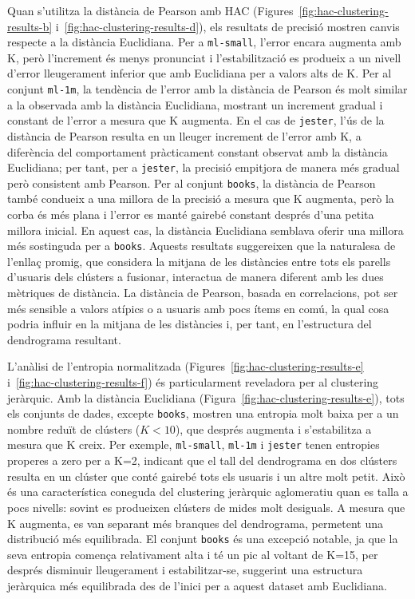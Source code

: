 \documentclass[a4paper,12pt]{report}
\begin{document}
Quan s'utilitza la distància de Pearson amb HAC (Figures~\ref{fig:hac-clustering-results-b} i~\ref{fig:hac-clustering-results-d}), els resultats de precisió mostren canvis respecte a la distància Euclidiana. Per a \texttt{ml-small}, l'error encara augmenta amb K, però l'increment és menys pronunciat i l'estabilització es produeix a un nivell d'error lleugerament inferior que amb Euclidiana per a valors alts de K. Per al conjunt \texttt{ml-1m}, la tendència de l'error amb la distància de Pearson és molt similar a la observada amb la distància Euclidiana, mostrant un increment gradual i constant de l'error a mesura que K augmenta. En el cas de \texttt{jester}, l'ús de la distància de Pearson resulta en un lleuger increment de l'error amb K, a diferència del comportament pràcticament constant observat amb la distància Euclidiana; per tant, per a \texttt{jester}, la precisió empitjora de manera més gradual però consistent amb Pearson. Per al conjunt \texttt{books}, la distància de Pearson també condueix a una millora de la precisió a mesura que K augmenta, però la corba és més plana i l'error es manté gairebé constant després d'una petita millora inicial. En aquest cas, la distància Euclidiana semblava oferir una millora més sostinguda per a \texttt{books}. Aquests resultats suggereixen que la naturalesa de l'enllaç promig, que considera la mitjana de les distàncies entre tots els parells d'usuaris dels clústers a fusionar, interactua de manera diferent amb les dues mètriques de distància. La distància de Pearson, basada en correlacions, pot ser més sensible a valors atípics o a usuaris amb pocs ítems en comú, la qual cosa podria influir en la mitjana de les distàncies i, per tant, en l'estructura del dendrograma resultant.

L'anàlisi de l'entropia normalitzada (Figures~\ref{fig:hac-clustering-results-e} i~\ref{fig:hac-clustering-results-f}) és particularment reveladora per al clustering jeràrquic. Amb la distància Euclidiana (Figura~\ref{fig:hac-clustering-results-e}), tots els conjunts de dades, excepte \texttt{books}, mostren una entropia molt baixa per a un nombre reduït de clústers ($K<10$), que després augmenta i s'estabilitza a mesura que K creix. Per exemple, \texttt{ml-small}, \texttt{ml-1m} i \texttt{jester} tenen entropies properes a zero per a K=2, indicant que el tall del dendrograma en dos clústers resulta en un clúster que conté gairebé tots els usuaris i un altre molt petit. Això és una característica coneguda del clustering jeràrquic aglomeratiu quan es talla a pocs nivells: sovint es produeixen clústers de mides molt desiguals. A mesura que K augmenta, es van separant més branques del dendrograma, permetent una distribució més equilibrada. El conjunt \texttt{books} és una excepció notable, ja que la seva entropia comença relativament alta i té un pic al voltant de K=15, per després disminuir lleugerament i estabilitzar-se, suggerint una estructura jeràrquica més equilibrada des de l'inici per a aquest dataset amb Euclidiana.
\end{document}
